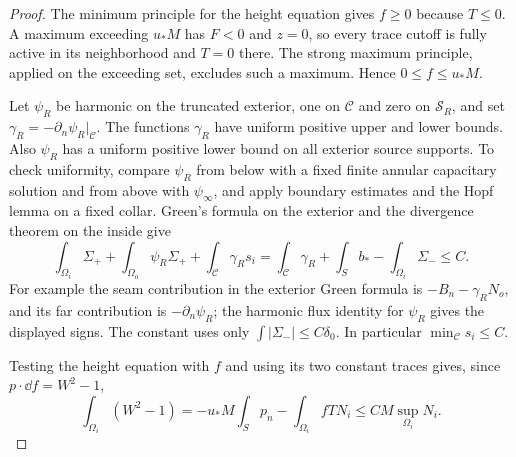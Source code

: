 \begin{proof}
The minimum principle for the height equation gives $f\ge0$ because
$T\le0$. A maximum exceeding $u_*M$ has $F<0$ and $z=0$, so every
trace cutoff is fully active in its neighborhood and $T=0$ there.
The strong maximum principle, applied on the exceeding set, excludes
such a maximum. Hence $0\le f\le u_*M$.

Let $\psi_R$ be harmonic on the truncated exterior, one on
$\mathcal C$ and zero on $\mathcal S_R$, and set
$\gamma_R=-\partial_n\psi_R|_{\mathcal C}$. The functions $\gamma_R$
have uniform positive upper and lower bounds. Also $\psi_R$ has a
uniform positive lower bound on all exterior source supports. To check
uniformity, compare $\psi_R$ from below with a fixed finite annular
capacitary solution and from above with $\psi_\infty$, and apply
boundary estimates and the Hopf lemma on a fixed collar. Green's
formula on the exterior and the divergence theorem on the inside give
\begin{equation}\label{eq:compact-capacity}
 \int_{\Omega_i}\Sigma_+
 +\int_{\Omega_o}\psi_R\Sigma_+
 +\int_{\mathcal C}\gamma_Rs_i
 =\int_{\mathcal C}\gamma_R+\int_S b_*
      -\int_{\Omega_i}\Sigma_-\le C.
\end{equation}
For example the seam contribution in the exterior Green formula is
$-B_n-\gamma_RN_o$, and its far contribution is
$-\partial_n\psi_R$; the harmonic flux identity for $\psi_R$ gives
the displayed signs. The constant uses only
$\int|\Sigma_-|\le C\delta_0$. In particular $\min_{\mathcal C}s_i\le C$.

Testing the height equation with $f$ and using its two constant traces
gives, since $p\cdot\dd f=W^2-1$,
\begin{equation}\label{eq:compact-height-energy}
 \int_{\Omega_i}(W^2-1)
 =-u_*M\int_S p_n-\int_{\Omega_i}fTN_i
 \le CM\sup_{\Omega_i}N_i.
\end{equation}


\end{proof}
